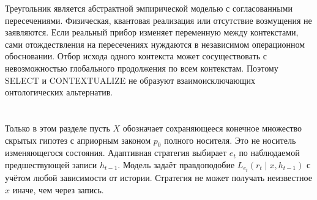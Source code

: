 {Треугольник является абстрактной эмпирической моделью с согласованными пересечениями. Физическая, квантовая реализация или отсутствие возмущения не заявляются. Если реальный прибор изменяет переменную между контекстами, сами отождествления на пересечениях нуждаются в независимом операционном обосновании. Отбор исхода одного контекста может сосуществовать с невозможностью глобального продолжения по всем контекстам. Поэтому SELECT и CONTEXTUALIZE не образуют взаимоисключающих онтологических альтернатив.}

\section{}
\label{sec:sequential}
{Только в этом разделе пусть $X$ обозначает сохраняющееся конечное множество скрытых гипотез с априорным законом $p_0$ полного носителя. Это не носитель изменяющегося состояния. Адаптивная стратегия выбирает $e_t$ по наблюдаемой предшествующей записи $h_{t-1}$. Модель задаёт правдоподобие $L_{e_t}(r_t\mid x,h_{t-1})$ с учётом любой зависимости от истории. Стратегия не может получать неизвестное $x$ иначе, чем через запись.}

